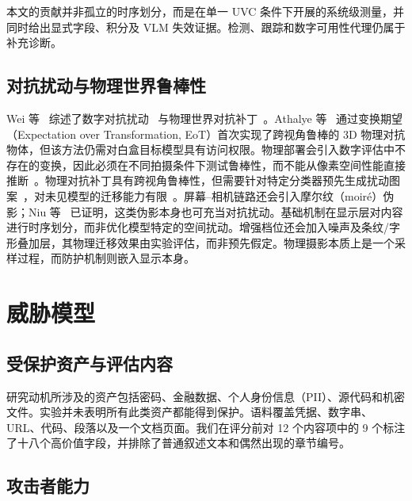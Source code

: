 \documentclass{ieeeaccess}
\begin{document}
本文的贡献并非孤立的时序划分，而是在单一 UVC 条件下开展的系统级测量，并同时给出显式字段、积分及 VLM 失效证据。检测、跟踪和数字可用性代理仍属于补充诊断。

\subsection{对抗扰动与物理世界鲁棒性}

Wei 等~\cite{b_wei2024} 综述了数字对抗扰动~\cite{b_goodfellow2015,b_madry2018,b_carlini2017} 与物理世界对抗补丁~\cite{b_eykholt2018,b_thys2019,b_xu2020}。Athalye 等~\cite{b_athalye2018} 通过变换期望（Expectation over Transformation, EoT）首次实现了跨视角鲁棒的 3D 物理对抗物体，但该方法仍需对白盒目标模型具有访问权限。物理部署会引入数字评估中不存在的变换，因此必须在不同拍摄条件下测试鲁棒性，而不能从像素空间性能直接推断~\cite{b_eykholt2018}。物理对抗补丁具有跨视角鲁棒性，但需要针对特定分类器预先生成扰动图案~\cite{b_thys2019,b_xu2020}，对未见模型的迁移能力有限~\cite{b_gu2024}。屏幕--相机链路还会引入摩尔纹（moir\'{e}）伪影；Niu 等~\cite{b_niu2021} 已证明，这类伪影本身也可充当对抗扰动。基础机制在显示层对内容进行时序划分，而非优化模型特定的空间扰动。增强档位还会加入噪声及条纹/字形叠加层，其物理迁移效果由实验评估，而非预先假定。物理摄影本质上是一个采样过程，而防护机制则嵌入显示本身。


\section{威胁模型}
\label{sec:threat}

\subsection{受保护资产与评估内容}

研究动机所涉及的资产包括密码、金融数据、个人身份信息（PII）、源代码和机密文件。实验并未表明所有此类资产都能得到保护。语料覆盖凭据、数字串、URL、代码、段落以及一个文档页面。我们在评分前对 12 个内容项中的 9 个标注了十八个高价值字段，并排除了普通叙述文本和偶然出现的章节编号。

\subsection{攻击者能力}
\end{document}
